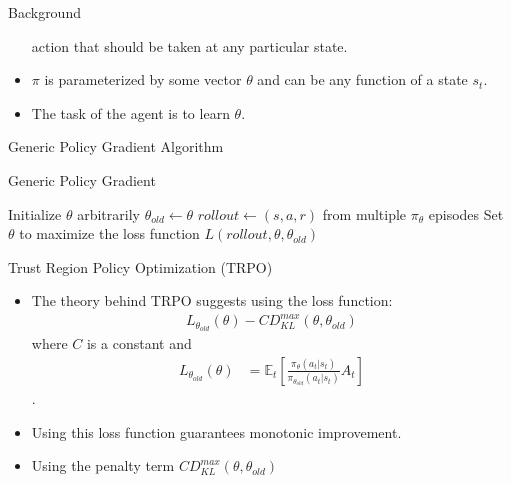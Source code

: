 \documentclass{beamer}
\begin{document}
\begin{frame}{Background}
\begin{itemize}
            action that should be taken at any particular state.
        \item $\pi$ is parameterized by some vector $\theta$ and can be any
            function of a state $s_t$.
        \item The task of the agent is to learn $\theta$.
    \end{itemize}
    \framebreak
    Generic Policy Gradient Algorithm
    \begin{algorithm}[H]
        \caption{Generic Policy Gradient}
        \begin{algorithmic}
            \State Initialize $\theta$ arbitrarily
                \State $\theta_{old} \gets \theta$
                \State $rollout \gets (s, a, r)$ from multiple
                $\pi_{\theta}$ episodes 
                \State Set $\theta$ to maximize the loss function $L(rollout,
                \theta, \theta_{old})$
            \EndWhile
        \end{algorithmic}
    \end{algorithm}
    \framebreak
    Trust Region Policy Optimization (TRPO)
    \begin{itemize}
        \item The theory behind TRPO suggests using the loss function:
        \begin{align*}
            L_{\theta_{old}}(\theta) 
            - CD_{KL}^{max}(\theta, \theta_{old})
        \end{align*}
        where $C$ is a constant and
        \begin{align*}
            L_{\theta_{old}}(\theta) &=
            \mathbb{E}_t \left[ 
            \frac
            {\pi_{\theta}(a_t | s_t)}
            {\pi_{\theta_{old}} (a_t | s_t)}
            A_t
            \right]
        \end{align*}.
        \item Using this loss function guarantees monotonic improvement.
        \item Using the penalty term $CD_{KL}^{max}(\theta, \theta_{old})$

\end{itemize}
\end{frame}
\end{document}
